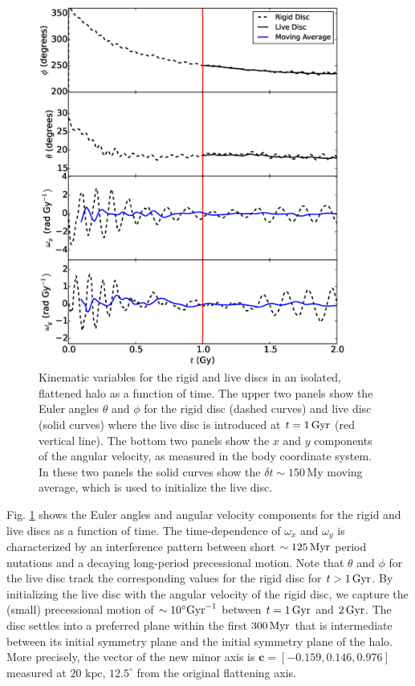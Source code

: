 \begin{figure}
\centering
\includegraphics[width=0.9\textwidth]{../figures/flattened_halo_regressions.eps}
\caption{Kinematic variables for the rigid and live discs in an
  isolated, flattened halo as a function of time.  The upper two
  panels show the Euler angles $\theta$ and $\phi$ for the rigid disc
  (dashed curves) and live disc (solid curves) where the live disc is
  introduced at $t=1\,{\rm Gyr}$ (red vertical line).  The bottom two
  panels show the $x$ and $y$ components of the angular velocity, as
  measured in the body coordinate system.  In these two panels the
  solid curves show the $\delta t \sim 150\, \text{My}$ moving
  average, which is used to initialize the live disc.}
\label{fig:flattened_halo_regression}
\end{figure}
  
Fig. \ref{fig:flattened_halo_regression} shows the Euler angles and
angular velocity components for the rigid and live discs as a function
of time.  The time-dependence of $\omega_x$ and $\omega_y$ is
characterized by an interference pattern between short $\sim 125\,{\rm
  Myr}$ period nutations and a decaying long-period
precessional motion. Note that $\theta$ and $\phi$ for the live disc
track the corresponding values for the rigid disc for $t>1\,{\rm
  Gyr}$.  By initializing the live disc with the angular velocity of
the rigid disc, we capture the (small) precessional motion of $\sim
10^\circ {\rm Gyr}^{-1}$ between $t = 1\,{\rm Gyr}$ and $2\,{\rm
  Gyr}$.  The disc settles into a preferred plane within the first
$300\,{\rm Myr}$ that is intermediate between its initial symmetry
plane and the initial symmetry plane of the halo. More precisely, the
vector of the new minor axis is $\textbf{c} = [-0.159,0.146,0.976]$
measured at $20\text{ kpc}$, $12.5^{\circ}$ from the original
flattening axis.

